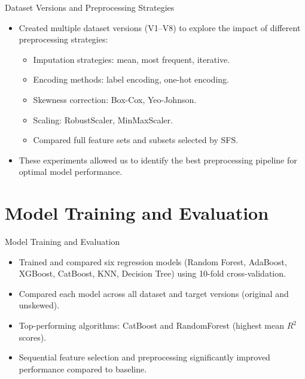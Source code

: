 \documentclass{beamer}
\begin{document}
\begin{frame}{Dataset Versions and Preprocessing Strategies}
    \begin{itemize}
        \item Created multiple dataset versions (V1–V8) to explore the impact of different preprocessing strategies:
        \begin{itemize}
            \item Imputation strategies: mean, most frequent, iterative.
            \item Encoding methods: label encoding, one-hot encoding.
            \item Skewness correction: Box-Cox, Yeo-Johnson.
            \item Scaling: RobustScaler, MinMaxScaler.
            \item Compared full feature sets and subsets selected by SFS.
        \end{itemize}
        \item These experiments allowed us to identify the best preprocessing pipeline for optimal model performance.
    \end{itemize}
\end{frame}

\section{Model Training and Evaluation}
\begin{frame}{Model Training and Evaluation}
    \begin{itemize}
        \item Trained and compared six regression models (Random Forest, AdaBoost, XGBoost, CatBoost, KNN, Decision Tree) using 10-fold cross-validation.
        \item Compared each model across all dataset and target versions (original and unskewed).
        \item Top-performing algorithms: CatBoost and RandomForest (highest mean $R^2$ scores).
        \item Sequential feature selection and preprocessing significantly improved performance compared to baseline.
    \end{itemize}
\end{frame}
\end{document}
